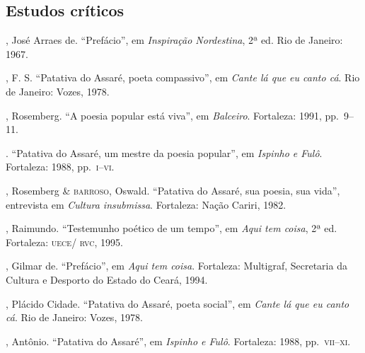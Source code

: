 \subsection{Estudos críticos}

\begin{bibliografia}[]

, José Arraes de. “Prefácio”, em \textit{Inspiração
Nordestina}, 2ª ed. Rio de Janeiro: 1967.

, F. S. ``Patativa do Assaré, poeta compassivo'', 
em \textit{Cante lá que eu canto cá}. Rio de Janeiro: Vozes, 
1978.

, Rosemberg. “A poesia popular está viva”, em 
\textit{Balceiro}. Fortaleza: 1991, pp.~9--11. 

\titidem. “Patativa do Assaré, um mestre da poesia popular”,
em \textit{Ispinho e Fulô}. Fortaleza: 1988, pp.~\textsc{i--vi}.

, Rosemberg \& \textsc{barroso}, Oswald. “Patativa do 
Assaré, sua poesia, sua vida”, entrevista em \textit{Cultura 
insubmissa}. Fortaleza: Nação Cariri, 1982.

, Raimundo. “Testemunho poético de um 
tempo”, em \textit{Aqui tem coisa}, 2ª ed. Fortaleza: \textsc{uece/
rvc}, 1995. 

, Gilmar de. “Prefácio”, em \textit{Aqui tem coisa}. 
Fortaleza: Multigraf, Secretaria da Cultura 
e Desporto do Estado do Ceará, 1994. 

, Plácido Cidade. “Patativa do Assaré, poeta 
social”, em \textit{Cante lá que eu canto cá}. Rio de Janeiro: 
Vozes, 1978.

, Antônio. “Patativa do Assaré”, em \textit{Ispinho e
Fulô}. Fortaleza: 1988, pp.~\textsc{vii--xi}.

\end{bibliografia}


